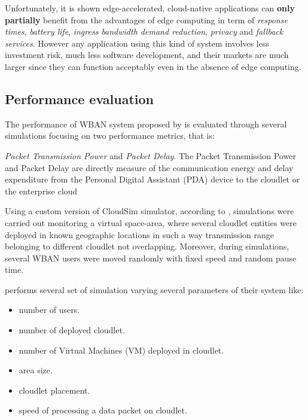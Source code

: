\documentclass[sigchi]{acmart}
\begin{document}
Unfortunately, it is shown edge-accelerated, cloud-native applications can \textbf{only partially} benefit from the advantages of edge computing in term of \textit{response times}, \textit{battery life}, \textit{ingress bandwidth demand reduction}, \textit{privacy} and \textit{fallback services}. However any application using this kind of system involves less investment risk, much less software development, and their markets are much larger since they can function acceptably even in the absence of edge computing.

\subsection{Performance evaluation}

The performance of WBAN system proposed by \citet{MSAReport} is evaluated through several simulations focusing on two performance metrics, that is:

\vspace{0.3cm}

\begin{quoting}[font=itshape, begintext={``}, endtext={''\cite[par.~4.2]{MSAReport}}]
\textit{Packet Transmission Power} and \textit{Packet Delay}. The Packet Transmission Power and Packet Delay are directly measure of the communication energy and delay expenditure from the Personal Digital Assistant (PDA) device to the cloudlet or the enterprise cloud

\end{quoting}

\vspace{0.3cm}

Using a custom version of CloudSim simulator, according to \citet{MSAReport}, simulations were carried out monitoring a virtual space-area, where several cloudlet entities were deployed in known geographic locations in such a way transmission range belonging to different cloudlet not overlapping. Moreover, during simulations, several WBAN users were moved randomly with fixed speed and random pause time. 

\citet{MSAReport} performs several set of simulation varying several parameters of their system like:
\begin{itemize}
\item number of users.
\item number of deployed cloudlet.
\item number of Virtual Machines (VM) deployed in cloudlet.
\item area size.
\item cloudlet placement.
\item speed of processing a data packet on cloudlet. 
\end{itemize}
\end{document}

